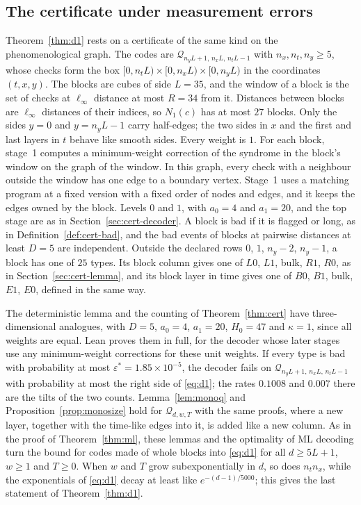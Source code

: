 \documentclass[11pt]{amsart}
\theoremstyle{definition}
\theoremstyle{remark}
\numberwithin{equation}{section}
\begin{document}
\subsection{The certificate under measurement errors}\label{sec:cert-meas}
Theorem~\ref{thm:d1} rests on a certificate of the same kind on the phenomenological graph. The codes are $\mathcal Q_{n_yL+1,\,n_xL,\,n_tL-1}$ with $n_x,n_t,n_y\ge5$, whose checks form the box $[0,n_tL)\times[0,n_xL)\times[0,n_yL)$ in the coordinates $(t,x,y)$. The blocks are cubes of side $L=35$, and the window of a block is the set of checks at $\ell_\infty$ distance at most $R=34$ from it. Distances between blocks are $\ell_\infty$ distances of their indices, so $N_1(c)$ has at most $27$ blocks. Only the sides $y=0$ and $y=n_yL-1$ carry half-edges; the two sides in $x$ and the first and last layers in $t$ behave like smooth sides. Every weight is $1$. For each block, stage~1 computes a minimum-weight correction of the syndrome in the block's window on the graph of the window. In this graph, every check with a neighbour outside the window has one edge to a boundary vertex. Stage~1 uses a matching program at a fixed version with a fixed order of nodes and edges, and it keeps the edges owned by the block. Levels $0$ and $1$, with $a_0=4$ and $a_1=20$, and the top stage are as in Section~\ref{sec:cert-decoder}. A block is bad if it is flagged or long, as in Definition~\ref{def:cert-bad}, and the bad events of blocks at pairwise distances at least $D=5$ are independent. Outside the declared rows $0$, $1$, $n_y-2$, $n_y-1$, a block has one of $25$ types. Its block column gives one of $L0$, $L1$, bulk, $R1$, $R0$, as in Section~\ref{sec:cert-lemma}, and its block layer in time gives one of $B0$, $B1$, bulk, $E1$, $E0$, defined in the same way.

The deterministic lemma and the counting of Theorem~\ref{thm:cert} have three-dimensional analogues, with $D=5$, $a_0=4$, $a_1=20$, $H_0=47$ and $\kappa=1$, since all weights are equal. Lean proves them in full, for the decoder whose later stages use any minimum-weight corrections for these unit weights. If every type is bad with probability at most $\varepsilon^\ast=1.85\times10^{-5}$, the decoder fails on $\mathcal Q_{n_yL+1,\,n_xL,\,n_tL-1}$ with probability at most the right side of \eqref{eq:d1}; the rates $0.1008$ and $0.007$ there are the tilts of the two counts. Lemma~\ref{lem:monoq} and Proposition~\ref{prop:monosize} hold for $\mathcal Q_{d,w,T}$ with the same proofs, where a new layer, together with the time-like edges into it, is added like a new column. As in the proof of Theorem~\ref{thm:ml}, these lemmas and the optimality of ML decoding turn the bound for codes made of whole blocks into \eqref{eq:d1} for all $d\ge5L+1$, $w\ge1$ and $T\ge0$. When $w$ and $T$ grow subexponentially in $d$, so does $n_tn_x$, while the exponentials of \eqref{eq:d1} decay at least like $e^{-(d-1)/5000}$; this gives the last statement of Theorem~\ref{thm:d1}.
\end{document}
